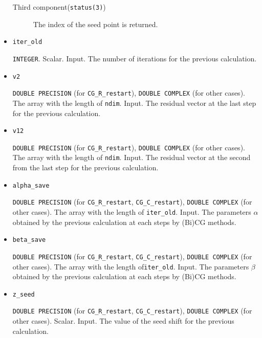 \documentclass[12pt,titlepage]{article}
\begin{document}
\begin{itemize}
\begin{description}
  \item [Third component(\texttt{status(3)})]
    The index of the seed point is returned.
  \end{description}

\item \verb|iter_old|

  \verb|INTEGER|. Scalar. Input. The number of iterations for the previous calculation.
  
\item \verb|v2|

  \verb|DOUBLE PRECISION| (for \verb|CG_R_restart|),
  \verb|DOUBLE COMPLEX| (for other cases).
  The array with the length of \verb|ndim|. Input.
  The residual vector at the last step for the previous calculation.

\item \verb|v12|

  \verb|DOUBLE PRECISION| (for \verb|CG_R_restart|),
  \verb|DOUBLE COMPLEX| (for other cases).
  The array with the length of \verb|ndim|. Input.
  The residual vector at the second from the last step for the previous calculation.

\item \verb|alpha_save|

  \verb|DOUBLE PRECISION| (for \verb|CG_R_restart|, \verb|CG_C_restart|),
  \verb|DOUBLE COMPLEX| (for other cases).
  The array with the length of \verb|iter_old|. Input. 
  The parameters $\alpha$ obtained by the previous calculation at each steps by (Bi)CG methods.

\item \verb|beta_save|

  \verb|DOUBLE PRECISION| (for \verb|CG_R_restart|, \verb|CG_C_restart|),
  \verb|DOUBLE COMPLEX| (for other cases).
  The array with the length of\verb|iter_old|. Input. 
  The parameters $\beta$ obtained by the previous calculation at each steps by (Bi)CG methods.

\item \verb|z_seed|

  \verb|DOUBLE PRECISION| (for \verb|CG_R_restart|, \verb|CG_C_restart|),
  \verb|DOUBLE COMPLEX| (for other cases).
  Scalar. Input. The value of the seed shift for the previous calculation.


\end{itemize}
\end{document}
